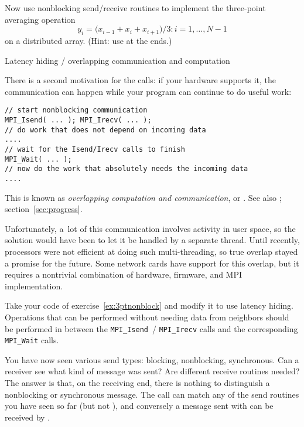 \begin{exercise}
  \label{ex:3ptnonblock}
  Now use nonblocking send/receive routines to implement
  the three-point averaging operation
  \[ y_i=\bigl( x_{i-1}+x_i+x_{i+1} \bigr)/3\colon i=1,\ldots,N-1 \]
  on a distributed array. (Hint: use  at the ends.)
\end{exercise}

 {Latency hiding / overlapping communication and computation}

There is a second motivation for the  calls:
if your hardware supports it, the communication can
happen
while your program can continue to do useful work:
\begin{lstlisting}
// start nonblocking communication
MPI_Isend( ... ); MPI_Irecv( ... );
// do work that does not depend on incoming data
....
// wait for the Isend/Irecv calls to finish
MPI_Wait( ... );
// now do the work that absolutely needs the incoming data
....
\end{lstlisting}
This is known as \emph{overlapping computation and communication}, or
%
.
See also ; section~\ref{sec:progress}.

Unfortunately, a~lot of this
communication involves activity in user space, so the solution would
have been to let it be handled by a separate thread. Until recently,
processors were not efficient at doing such multi-threading, so true
overlap stayed a promise for the future. Some network cards have
support for this overlap, but it requires a nontrivial combination of
hardware, firmware, and MPI implementation.

\begin{exercise}
  \label{ex:3ptnonblock-hide}
  Take your code of exercise~\ref{ex:3ptnonblock} and modify it to use
  latency hiding. Operations that can be performed without needing
  data from neighbors should be performed in between the
  \lstinline{MPI_Isend}~/ \lstinline{MPI_Irecv} calls and the
  corresponding \lstinline{MPI_Wait} calls.
\end{exercise}

\begin{remark}
  You have now seen various send types: blocking, nonblocking, synchronous.
  Can a receiver see what kind of message was sent? Are different receive
  routines needed?
  The answer is that, on the receiving end, there is nothing to distinguish
  a nonblocking or
  synchronous message. The  call can match any of the
  send routines you have seen so far (but not ), and
  conversely a message sent with 
  can be received by .
\end{remark}

